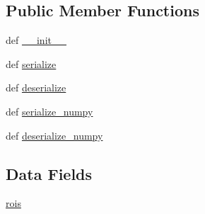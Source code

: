 \subsection*{Public Member Functions}
\begin{DoxyCompactItemize}
\item 
def \hyperlink{classsocial__robot_1_1msg_1_1__RegionOfInterests_1_1RegionOfInterests_a8622f3adf8985facf9bf207304dc2175}{\-\_\-\-\_\-init\-\_\-\-\_\-}
\item 
def \hyperlink{classsocial__robot_1_1msg_1_1__RegionOfInterests_1_1RegionOfInterests_a923aa697f103be1faf6e6b3333a68480}{serialize}
\item 
def \hyperlink{classsocial__robot_1_1msg_1_1__RegionOfInterests_1_1RegionOfInterests_adf54f7bf90d2beaf41efe747f59e6cef}{deserialize}
\item 
def \hyperlink{classsocial__robot_1_1msg_1_1__RegionOfInterests_1_1RegionOfInterests_a1a21ae43fa428c9c69ee1694c3feb6f0}{serialize\-\_\-numpy}
\item 
def \hyperlink{classsocial__robot_1_1msg_1_1__RegionOfInterests_1_1RegionOfInterests_a6c0e8bbb66120a0c4283bf2a2c0233ce}{deserialize\-\_\-numpy}
\end{DoxyCompactItemize}
\subsection*{Data Fields}
\begin{DoxyCompactItemize}
\item 
\hyperlink{classsocial__robot_1_1msg_1_1__RegionOfInterests_1_1RegionOfInterests_a8a3a7cdebdf6d59f6608ffe93a8d6853}{rois}
\end{DoxyCompactItemize}


